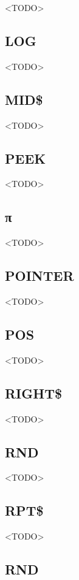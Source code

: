 <TODO>

\subsection{LOG}

<TODO>

\subsection{MID\$}

<TODO>

\subsection{PEEK}

<TODO>

\subsection{\ttfamily π}

<TODO>

\subsection{POINTER}

<TODO>

\subsection{POS}

<TODO>

\subsection{RIGHT\$}

<TODO>

\subsection{RND}

<TODO>

\subsection{RPT\$}

<TODO>

\subsection{RND}

